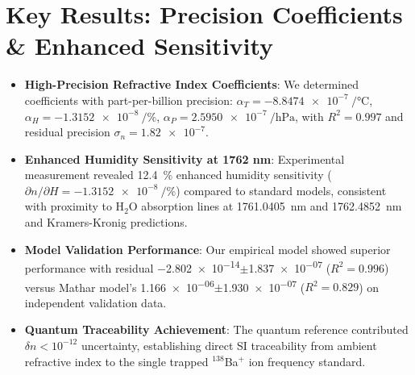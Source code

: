 \documentclass[aip,reprint,groupedaddress,onecolumn,superscriptaddress]{revtex4-2}
\begin{document}
\section{Key Results: Precision Coefficients \& Enhanced Sensitivity}
\begin{itemize}
    \item \textbf{High-Precision Refractive Index Coefficients}: We determined coefficients with part-per-billion precision: $\alpha_T = \SI{-8.8474e-7}{\per\degreeCelsius}$, $\alpha_H = \SI{-1.3152e-8}{\per\percent}$, $\alpha_P = \SI{+2.5950e-7}{\per\hecto\pascal}$, with $R^2 = 0.997$ and residual precision $\sigma_n = \num{1.82e-7}$.
    
    \item \textbf{Enhanced Humidity Sensitivity at 1762 nm}: Experimental measurement revealed \SI{12.4}{\percent} enhanced humidity sensitivity ($\partial n/\partial H = \SI{-1.3152e-8}{\per\percent}$) compared to standard models, consistent with proximity to H$_2$O absorption lines at \SI{1761.0405}{\nano\meter} and \SI{1762.4852}{\nano\meter} and Kramers-Kronig predictions.
    
    \item \textbf{Model Validation Performance}: Our empirical model showed superior performance with residual \num{-2.802e-14}$\pm$\num{1.837e-07} ($R^2 = 0.996$) versus Mathar model's \num{1.166e-06}$\pm$\num{1.930e-07} ($R^2 = 0.829$) on independent validation data.
    
    \item \textbf{Quantum Traceability Achievement}: The quantum reference contributed $\delta n < 10^{-12}$ uncertainty, establishing direct SI traceability from ambient refractive index to the single trapped $^{138}$Ba$^+$ ion frequency standard.
\end{itemize}
\end{document}
